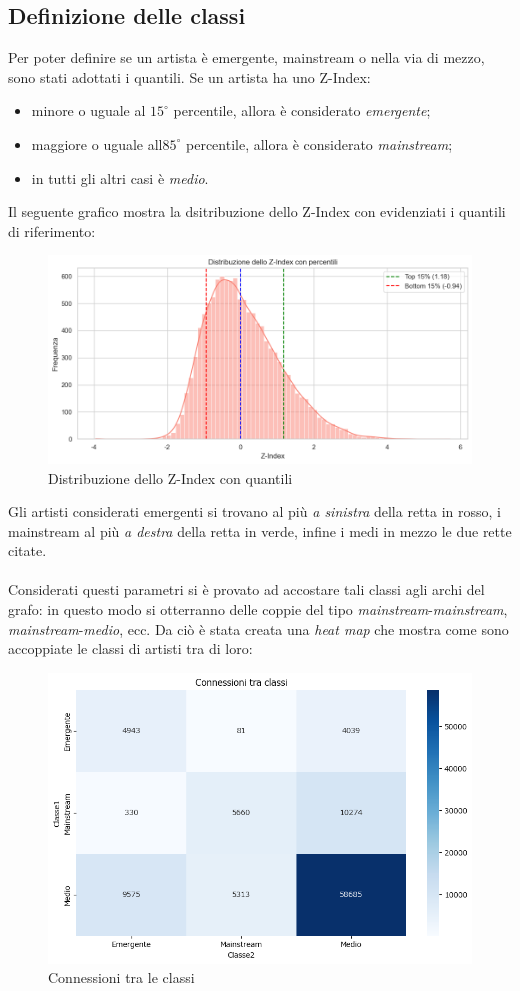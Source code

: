 \documentclass[sigchi]{acmart}
\begin{document}
\subsection{Definizione delle classi}

Per poter definire se un artista è emergente, mainstream o nella via di mezzo, sono stati adottati i quantili. Se un artista ha uno Z-Index:

\begin{itemize}
\item minore o uguale al $15^\circ$ percentile, allora è considerato {\itshape emergente};
\item maggiore o uguale all\textquotesingle$85^\circ$ percentile, allora è considerato {\itshape mainstream};
\item in tutti gli altri casi è {\itshape medio}.
\end{itemize}

Il seguente grafico mostra la dsitribuzione dello Z-Index con evidenziati i quantili di riferimento:

\begin{figure}[H]
\centering
\includegraphics[width=0.45
\textwidth]{../open_problem/plots/3_2/popDistPc.png}
\caption{Distribuzione dello Z-Index con quantili}
\label{fig:popDistPc}
\end{figure}

\noindent Gli artisti considerati emergenti si trovano al più {\itshape a sinistra} della retta in rosso, i mainstream al più {\itshape a destra} della retta in verde, infine i medi in mezzo le due rette citate. \\ \\ Considerati questi parametri si è provato ad accostare tali classi agli archi del grafo: in questo modo si otterranno delle coppie del tipo {\itshape mainstream}-{\itshape mainstream}, {\itshape mainstream}-{\itshape medio}, ecc. Da ciò è stata creata una {\itshape heat map} che mostra come sono accoppiate le classi di artisti tra di loro:

\begin{figure}[H]
\centering
\includegraphics[width=0.45
\textwidth]{../open_problem/plots/3_2/clConnection.png}
\caption{Connessioni tra le classi}
\label{fig:clConnection}
\end{figure}
\end{document}
